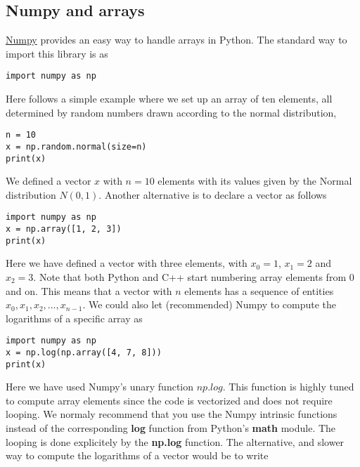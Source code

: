 \documentclass[%
oneside,                 %
final,                   %
10pt]{article}
\begin{document}
\subsection*{Numpy and arrays}
\href{{http://www.numpy.org/}}{Numpy} provides an easy way to handle arrays in Python. The standard way to import this library is as
\begin{verbatim}
import numpy as np
\end{verbatim}
Here follows a simple example where we set up an array of ten elements, all determined by random numbers drawn according to the normal distribution,
\begin{verbatim}
n = 10
x = np.random.normal(size=n)
print(x)
\end{verbatim}
We defined a vector $x$ with $n=10$ elements with its values given by the Normal distribution $N(0,1)$.
Another alternative is to declare a vector as follows
\begin{verbatim}
import numpy as np
x = np.array([1, 2, 3])
print(x)
\end{verbatim}
Here we have defined a vector with three elements, with $x_0=1$, $x_1=2$ and $x_2=3$. Note that both Python and C++
start numbering array elements from $0$ and on. This means that a vector with $n$ elements has a sequence of entities $x_0, x_1, x_2, \dots, x_{n-1}$. We could also let (recommended) Numpy to compute the logarithms of a specific array as
\begin{verbatim}
import numpy as np
x = np.log(np.array([4, 7, 8]))
print(x)
\end{verbatim}

Here we have used Numpy's unary function $np.log$. This function is
highly tuned to compute array elements since the code is vectorized
and does not require looping. We normaly recommend that you use the
Numpy intrinsic functions instead of the corresponding \textbf{log} function
from Python's \textbf{math} module. The looping is done explicitely by the
\textbf{np.log} function. The alternative, and slower way to compute the
logarithms of a vector would be to write
\end{document}
